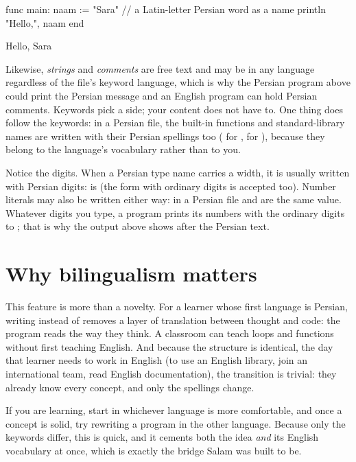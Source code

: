 \begin{salamen}
func main:
    naam := "Sara"        // a Latin-letter Persian word as a name
    println "Hello,", naam
end
\end{salamen}

\begin{progout}
Hello, Sara
\end{progout}

Likewise, \emph{strings} and \emph{comments} are free text and may be in any
language regardless of the file's keyword language, which is why the Persian
program above could print the Persian message  and an
English program can hold Persian comments. Keywords pick a side; your content does
not have to. One thing does follow the keywords: in a Persian file, the built-in
functions and standard-library names are written with their Persian spellings too
( for ,  for ), because
they belong to the language's vocabulary rather than to you.

\begin{note}
Notice the digits. When a Persian type name carries a width, it is usually written
with Persian digits:  is  (the form with ordinary digits
is accepted too). Number literals may also be written either way: in a Persian file
 and  are the same value. Whatever digits you type, a program
prints its numbers with the ordinary digits  to ; that is why the
output above shows  after the Persian text.
\end{note}

\section{Why bilingualism matters}

This feature is more than a novelty. For a learner whose first language is
Persian, writing  instead of  removes a layer of
translation between thought and code: the program reads the way they think. A
classroom can teach loops and functions without first teaching English. And
because the structure is identical, the day that learner needs to work in English
(to use an English library, join an international team, read English
documentation), the transition is trivial: they already know every concept, and
only the spellings change.

\begin{tip}
If you are learning, start in whichever language is more comfortable, and once a
concept is solid, try rewriting a program in the other language. Because only the
keywords differ, this is quick, and it cements both the idea \emph{and} its
English vocabulary at once, which is exactly the bridge Salam was built to be.
\end{tip}

